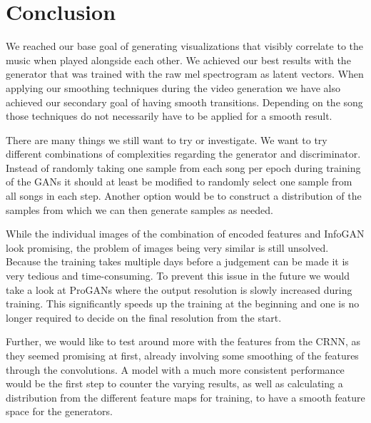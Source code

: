 \chapter{Conclusion}

    We reached our base goal of generating visualizations that visibly correlate to the music when played alongside each other. We achieved our best results with the generator that was trained with the raw mel spectrogram as latent vectors. When applying our smoothing techniques during the video generation we have also achieved our secondary goal of having smooth transitions. Depending on the song those techniques do not necessarily have to be applied for a smooth result.

    There are many things we still want to try or investigate. We want to try different combinations of complexities regarding the generator and discriminator. Instead of randomly taking one sample from each song per epoch during training of the GANs it should at least be modified to randomly select one sample from all songs in each step. Another option would be to construct a distribution of the samples from which we can then generate samples as needed.
    
    While the individual images of the combination of encoded features and InfoGAN look promising, the problem of images being very similar is still unsolved. Because the training takes multiple days before a judgement can be made it is very tedious and time-consuming. To prevent this issue in the future we would take a look at ProGANs where the output resolution is slowly increased during training. This significantly speeds up the training at the beginning and one is no longer required to decide on the final resolution from the start.

    Further, we would like to test around more with the features from the CRNN, as they seemed promising at first, already involving some smoothing of the features through the convolutions. A model with a much more consistent performance would be the first step to counter the varying results, as well as calculating a distribution from the different feature maps for training, to have a smooth feature space for the generators.